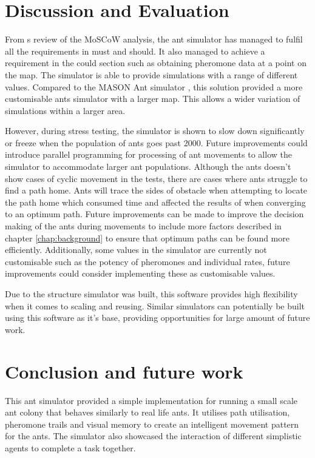 \documentclass[a4paper, oneside, 11pt]{report}
\begin{document}
\chapter{Discussion and Evaluation}
\label{chap:discussion}

From s review of the MoSCoW analysis, the ant simulator has managed to fulfil all the requirements in must and should. It also managed to achieve a requirement in the could section such as obtaining pheromone data at a point on the map. The simulator is able to provide simulations with a range of different values. Compared to the MASON Ant simulator \citep{Ant_Simulator}, this solution provided a more customisable ants simulator with a larger map. This allows a wider variation of simulations within a larger area.

However, during stress testing, the simulator is shown to slow down significantly or freeze when the population of ants goes past 2000. Future improvements could introduce parallel programming for processing of ant movements to allow the simulator to accommodate larger ant populations. Although the ants doesn't show cases of cyclic movement in the tests, there are cases where ants struggle to find a path home. Ants will trace the sides of obstacle when attempting to locate the path home which consumed time and affected the results of when converging to an optimum path. Future improvements can be made to improve the decision making of the ants during movements to include more factors described in chapter \ref{chap:background} to ensure that optimum paths can be found more efficiently. Additionally, some values in the simulator are currently not customisable such as the potency of pheromones and individual rates, future improvements could consider implementing these as customisable values.

Due to the structure simulator was built, this software provides high flexibility when it comes to scaling and reusing. Similar simulators can potentially be built using this software as it's base, providing opportunities for large amount of future work.

\chapter{Conclusion and future work}
\label{chap:conclusion}
This ant simulator provided a simple implementation for running a small scale ant colony that behaves similarly to real life ants. It utilises path utilisation, pheromone trails and visual memory to create an intelligent movement pattern for the ants. The simulator also showcased the interaction of different simplistic agents to complete a task together.
\end{document}

